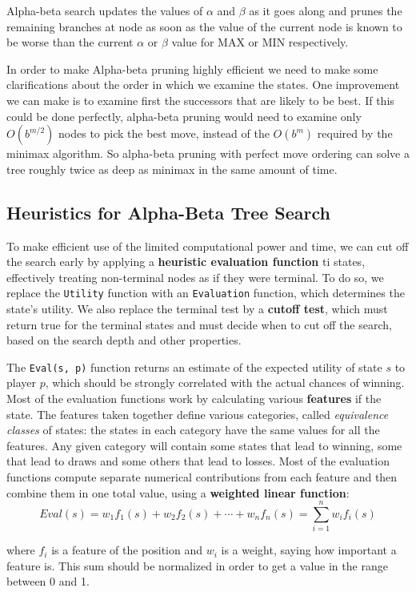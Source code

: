 \documentclass{article}
\begin{document}
Alpha-beta search updates the values of $\alpha$ and $\beta$ as it goes along and prunes the remaining branches at node as soon as the value of the current node is known to be worse than the current $\alpha$ or $\beta$ value for MAX or MIN respectively.

In order to make Alpha-beta pruning highly efficient we need to make some clarifications about the order in which we examine the states. One improvement we can make is to examine first the successors that are likely to be best. If this could be done perfectly, alpha-beta pruning would need to examine only $O(b^{m/2})$ nodes to pick the best move, instead of the $O(b^m)$ required by the minimax algorithm. So alpha-beta pruning with perfect move ordering can solve a tree roughly twice as deep as minimax in the same amount of time.

\subsection{Heuristics for Alpha-Beta Tree Search}
To make efficient use of the limited computational power and time, we can cut off the search early by applying a \textbf{heuristic evaluation function} ti states, effectively treating non-terminal nodes as if they were terminal. To do so, we replace the \lstinline{Utility} function with an \lstinline{Evaluation} function, which determines the state's utility. We also replace the terminal test by a \textbf{cutoff test}, which must return true for the terminal states and must decide when to cut off the search, based on the search depth and other properties.

The \lstinline{Eval(s, p)} function returns an estimate of the expected utility of state $s$ to player $p$, which should be strongly correlated with the actual chances of winning. Most of the evaluation functions work by calculating various \textbf{features} if the state. The features taken together define various categories, called \textit{equivalence classes} of states: the states in each category have the same values for all the features. Any given category will contain some states that lead to winning, some that lead to draws and some others that lead to losses. Most of the evaluation functions compute separate numerical contributions from each feature and then combine them in one total value, using a \textbf{weighted linear function}:
\[Eval(s) = w_1f_1(s)+w_2f_2(s)+\cdots+w_nf_n(s) = \sum_{i=1}^{n}w_if_i(s)\]

\noindent where $f_i$ is a feature of the position and $w_i$ is a weight, saying how important a feature is. This sum should be normalized in order to get a value in the range between 0 and 1.
\end{document}
